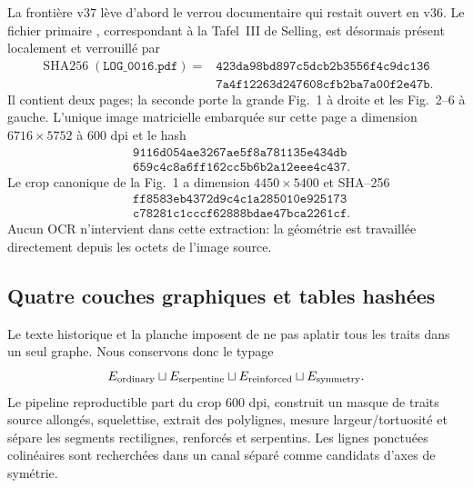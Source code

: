 \documentclass[11pt,a4paper]{article}
\begin{document}
La frontière v37 lève d'abord le verrou documentaire qui restait ouvert en v36. Le fichier primaire , correspondant à la Tafel~III de Selling, est désormais présent localement et verrouillé par
\[
 \begin{aligned}
 \operatorname{SHA256}(\texttt{LOG\_0016.pdf})={}&\texttt{423da98bd897c5dcb2b3556f4c9dc136}\\
 &\texttt{7a4f12263d247608cfb2ba7a00f2e47b}.
 \end{aligned}
\]
Il contient deux pages; la seconde porte la grande Fig.~1 à droite et les Fig.~2--6 à gauche. L'unique image matricielle embarquée sur cette page a dimension $6716\times5752$ à $600$ dpi et le hash
\[
 \begin{aligned}
 &\texttt{9116d054ae3267ae5f8a781135e434db}\\
 &\texttt{659c4c8a6ff162cc5b6b2a12eee4c437}.
 \end{aligned}
\]
Le crop canonique de la Fig.~1 a dimension $4450\times5400$ et SHA--256
\[
 \begin{aligned}
 &\texttt{ff8583eb4372d9c4c1a285010e925173}\\
 &\texttt{c78281c1cccf62888bdae47bca2261cf}.
 \end{aligned}
\]
Aucun OCR n'intervient dans cette extraction: la géométrie est travaillée directement depuis les octets de l'image source.

\subsection{Quatre couches graphiques et tables hashées}

Le texte historique et la planche imposent de ne pas aplatir tous les traits dans un seul graphe. Nous conservons donc le typage
\[
 E_{\rm ordinary}\sqcup E_{\rm serpentine}\sqcup
 E_{\rm reinforced}\sqcup E_{\rm symmetry}.
\]
Le pipeline reproductible  part du crop $600$ dpi, construit un masque de traits source allongés, squelettise, extrait des polylignes, mesure largeur/tortuosité et sépare les segments rectilignes, renforcés et serpentins. Les lignes ponctuées colinéaires sont recherchées dans un canal séparé comme candidats d'axes de symétrie.
\end{document}
